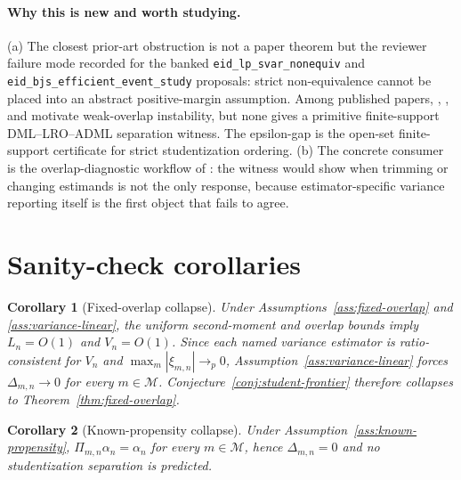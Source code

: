 \documentclass[11pt]{article}
\theoremstyle{definition}
\theoremstyle{plain}
\newtheorem{corollary}{Corollary}
\theoremstyle{remark}
\begin{document}
\paragraph{Why this is new and worth studying.}
(a) The closest prior-art obstruction is not a paper theorem but the reviewer failure mode recorded for the banked \texttt{eid\_lp\_svar\_nonequiv} and \texttt{eid\_bjs\_efficient\_event\_study} proposals: strict non-equivalence cannot be placed into an abstract positive-margin assumption.  Among published papers, \citet{CrumpHotzImbensMitnik2009}, \citet{HongLeungLi2020}, and \citet{ChernozhukovNeweySingh2022RR} motivate weak-overlap instability, but none gives a primitive finite-support DML--LRO--ADML separation witness.  The epsilon-gap is the open-set finite-support certificate for strict studentization ordering.  (b) The concrete consumer is the overlap-diagnostic workflow of \citet{CrumpHotzImbensMitnik2009}: the witness would show when trimming or changing estimands is not the only response, because estimator-specific variance reporting itself is the first object that fails to agree.

\section{Sanity-check corollaries}
\begin{corollary}[Fixed-overlap collapse]\label{cor:fixed-collapse}
Under Assumptions~\ref{ass:fixed-overlap} and \ref{ass:variance-linear}, the uniform second-moment and overlap bounds imply \(L_n=O(1)\) and \(V_n=O(1)\).  Since each named variance estimator is ratio-consistent for \(V_n\) and \(\max_m|\xi_{m,n}|\to_p0\), Assumption~\ref{ass:variance-linear} forces \(\Delta_{m,n}\to0\) for every \(m\in\mathcal M\).  Conjecture~\ref{conj:student-frontier} therefore collapses to Theorem~\ref{thm:fixed-overlap}.
\end{corollary}

\begin{corollary}[Known-propensity collapse]\label{cor:known-propensity}
Under Assumption~\ref{ass:known-propensity}, \(\Pi_{m,n}\alpha_n=\alpha_n\) for every \(m\in\mathcal M\), hence \(\Delta_{m,n}=0\) and no studentization separation is predicted.
\end{corollary}
\end{document}

